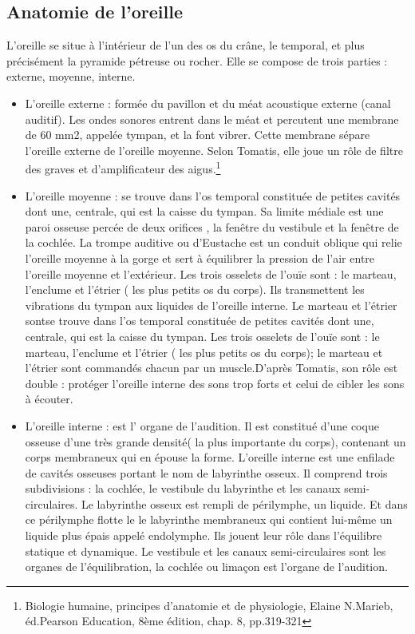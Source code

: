 \subsection{Anatomie de l'oreille}
L'oreille se situe à l'intérieur de l'un des os du crâne, le temporal, et plus précisément la pyramide pétreuse ou rocher. Elle se compose de trois parties : externe, moyenne, interne.
\begin{itemize}
	\item  L'oreille externe : formée du pavillon et du méat acoustique externe
(canal auditif). Les ondes sonores entrent dans le méat et percutent
une membrane de 60 mm2, appelée tympan, et la font vibrer. Cette membrane
sépare l'oreille externe de l'oreille moyenne. Selon Tomatis, elle
joue un rôle de filtre des graves et d'amplificateur des aigus.\footnote{Biologie humaine, principes d'anatomie et de physiologie, Elaine N.Marieb,
	éd.Pearson Education, 8ème édition, chap. 8, pp.319-321}
	\item L'oreille moyenne :
se trouve dans l'os temporal constituée de petites cavités dont une, centrale, qui est la caisse du tympan. Sa limite
médiale est une paroi osseuse percée de deux orifices , la fenêtre
du vestibule et la fenêtre de la cochlée. La trompe auditive ou d'Eustache
est un conduit oblique qui relie l'oreille moyenne à la gorge et sert
à équilibrer la pression de l'air entre l'oreille moyenne et l'extérieur.
Les trois osselets de l'ouïe sont : le marteau, l'enclume et l'étrier
( les plus petits os du corps). Ils transmettent les vibrations du
tympan aux liquides de l'oreille interne. Le marteau et l'étrier sontse
trouve dans l'os temporal constituée de petites cavités dont une,
centrale, qui est la caisse du tympan. Les trois osselets de l'ouïe
sont : le marteau, l'enclume et l'étrier ( les plus petits os du corps);
le marteau et l'étrier sont commandés chacun par un muscle.D'après
Tomatis, son rôle est double : protéger l'oreille interne des sons
trop forts et celui de cibler les sons à écouter.
\item L'oreille interne
: est l' organe de l\textquoteright audition. Il
est constitué d'une coque osseuse d'une très grande densité( la plus
importante du corps), contenant un corps membraneux qui en épouse
la forme. L'oreille interne est une enfilade de cavités osseuses portant
le nom de labyrinthe osseux. Il comprend trois subdivisions : la cochlée,
le vestibule du labyrinthe et les canaux semi-circulaires. Le labyrinthe
osseux est rempli de périlymphe, un liquide. Et dans ce périlymphe
flotte le le labyrinthe membraneux qui contient lui-même un liquide
plus épais appelé endolymphe. Ils jouent leur rôle dans l'équilibre
statique et dynamique. Le vestibule et les canaux semi-circulaires
sont les organes de l\textquoteright équilibration, la cochlée ou
limaçon est l'organe de l'audition. 
\end{itemize}

